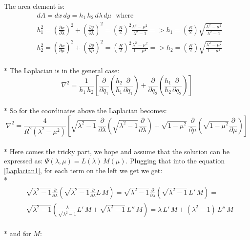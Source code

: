 \documentclass[11pt, oneside]{article}   	%
\begin{document}
The area element is:
\begin{equation}
\begin{split}
& dA = dx\, dy = h_1\, h_2 \, d\lambda\,d\mu\,\,\,\,\text{where} \\
& h_1^2 = \left(\frac{\partial x}{\partial \lambda}\right)^2 + \left(\frac{\partial y}{\partial \lambda}\right)^2  = 
\left(\frac{R}{2}\right)^2 \frac{ \lambda^2 - \mu ^2}{\lambda^2 - 1} => 
h_1 =   \left(\frac{R}{2}\right) \sqrt{ \frac{ \lambda^2 - \mu ^2}{\lambda^2 - 1} }\\
& h_2^2 = \left(\frac{\partial x}{\partial \mu}\right)^2 + \left(\frac{\partial y}{\partial \mu}\right)^2  = 
\left( \frac{R}{2} \right)^2 \frac{ \lambda^2 - \mu ^2}{1 - \mu ^2 } => 
h_2  = \left( \frac{R}{2} \right) \sqrt{ \frac{ \lambda^2 - \mu ^2}{1 - \mu ^2 } }
\end{split}
\end{equation}\\*
The Laplacian is in the general case:
\begin{equation}
\nabla^2 = \frac{1}{h_1\,h_2}\left[\frac{\partial}{\partial q_1}\left(\frac{h_2}{h_1}\frac{\partial}{\partial q_1} \right) + \frac{\partial}{\partial q_2}
\left(\frac{h_1}{h_2} \frac{\partial}{\partial q_2} \right) \right]
\end{equation}\\*
So for the coordinates above the Laplacian becomes:
\begin{equation}\label{Laplacian1}
\nabla^2  = \frac{4}{R^2\left( \lambda ^2 - \mu ^ 2 \right)} \left[ \sqrt{\lambda ^2 -1}\,\frac{\partial }{ \partial \lambda}\left( \sqrt{\lambda ^2 -1}\frac{\partial}{\partial \lambda} \right)  + \sqrt{1 - \mu ^2}\,\frac{\partial }{ \partial \mu}\left( \sqrt{1 - \mu ^2}\frac{\partial}{\partial \mu} \right) \right]
\end{equation}\\*
Here comes the tricky part, we hope and assume that the solution can be expressed as: $ \Psi(\lambda, \mu) = L(\lambda)\,M(\mu) $. Plugging that into the equation \eqref{Laplacian1}, for each term on the left we get we get:\\*
\begin{equation}\label{LL}
\begin{split}
& \sqrt{\lambda ^ 2 - 1}\frac{\partial}{\partial \lambda }\left( \sqrt{\lambda^2 - 1}\frac{\partial }{ \partial \lambda}L\,M \right) = 
\sqrt{\lambda ^ 2 - 1}\frac{\partial}{\partial \lambda}\left(  \sqrt{\lambda^2 - 1}\,L' \, M  \right) = \\
& \sqrt{\lambda ^ 2 - 1}\left( \frac{\lambda}{ \sqrt{\lambda^2 - 1} }L'\,M +  \sqrt{\lambda^2 - 1}\,L''\,M \right)  = 
\lambda\,L'\,M + \left(\lambda^2 - 1 \right)\,L''\,M
\end{split}
\end{equation}\\* and for $ M $:
\end{document}
